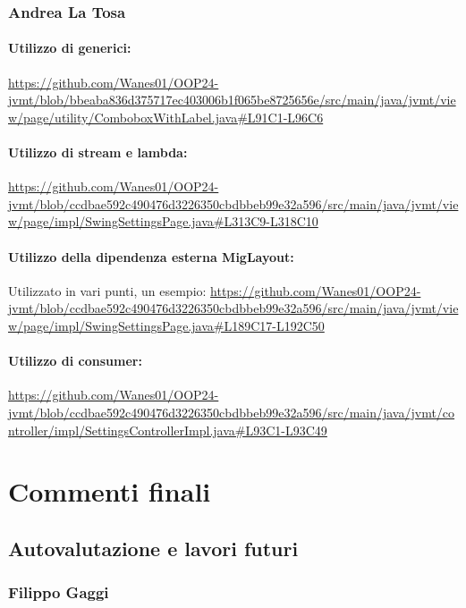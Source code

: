 \documentclass[a4paper,12pt]{report}
\begin{document}
\subsection{Andrea La Tosa}

\subsubsection{Utilizzo di generici:} \url{https://github.com/Wanes01/OOP24-jvmt/blob/bbeaba836d375717ec403006b1f065be8725656e/src/main/java/jvmt/view/page/utility/ComboboxWithLabel.java#L91C1-L96C6}

\subsubsection{Utilizzo di stream e lambda:} \url{https://github.com/Wanes01/OOP24-jvmt/blob/ccdbae592c490476d3226350cbdbbeb99e32a596/src/main/java/jvmt/view/page/impl/SwingSettingsPage.java#L313C9-L318C10}

\subsubsection{Utilizzo della dipendenza esterna MigLayout:}
Utilizzato in vari punti, un esempio: \url{https://github.com/Wanes01/OOP24-jvmt/blob/ccdbae592c490476d3226350cbdbbeb99e32a596/src/main/java/jvmt/view/page/impl/SwingSettingsPage.java#L189C17-L192C50}

\subsubsection{Utilizzo di consumer:} \url{https://github.com/Wanes01/OOP24-jvmt/blob/ccdbae592c490476d3226350cbdbbeb99e32a596/src/main/java/jvmt/controller/impl/SettingsControllerImpl.java#L93C1-L93C49}

\chapter{Commenti finali}

\section{Autovalutazione e lavori futuri}

\subsection{Filippo Gaggi}
\end{document}
